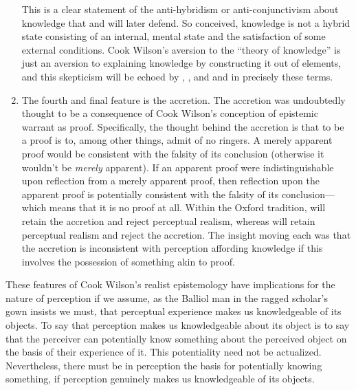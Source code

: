 \documentclass[12pt]{article}
\begin{document}
\begin{enumerate}[(1)]
\begin{quote}
		\end{quote}
This is a clear statement of the anti-hybridism or anti-conjunctivism about knowledge that \citet{McDowell:1982kx} and \citet{Williamson:2000lr} will later defend. So conceived, knowledge is not a hybrid state consisting of an internal, mental state and the satisfaction of some external conditions. Cook Wilson's aversion to the ``theory of knowledge'' is just an aversion to explaining knowledge by constructing it out of elements, and this skepticism will be echoed by \citet{Prichard:1950tg}, \citet{Ryle:1949qr}, and \citet{Austin:1962lr} and in precisely these terms.
	\item The fourth and final feature is the accretion. The accretion was undoubtedly thought to be a consequence of Cook Wilson's conception of epistemic warrant as proof. Specifically, the thought behind the accretion is that to be a proof is to, among other things, admit of no ringers. A merely apparent proof would be consistent with the falsity of its conclusion (otherwise it wouldn't be \emph{merely} apparent). If an apparent proof were indistinguishable upon reflection from a merely apparent proof, then reflection upon the apparent proof is potentially consistent with the falsity of its conclusion---which means that it is no proof at all. Within the Oxford tradition, \citet{Prichard:1938ve} will retain the accretion and reject perceptual realism, whereas \citet{Austin:1962lr} will retain perceptual realism and reject the accretion. The insight moving each was that the accretion is inconsistent with perception affording knowledge if this involves the possession of something akin to proof.
\end{enumerate}

These features of Cook Wilson's realist epistemology have implications for the nature of perception if we assume, as the Balliol man in the ragged scholar's gown insists we must, that perceptual experience makes us knowledgeable of its objects. To say that perception makes us knowledgeable about its object is to say that the perceiver can potentially know something about the perceived object on the basis of their experience of it. This potentiality need not be actualized. Nevertheless, there must be in perception the basis for potentially knowing something, if perception genuinely makes us knowledgeable of its objects.
\end{document}
